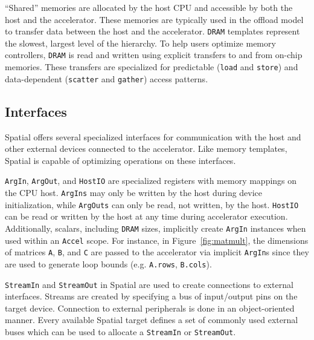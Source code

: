 ``Shared'' memories are allocated by the host CPU and accessible by both the host and the accelerator.
These memories are typically used in the offload model to transfer data between the host and the accelerator.
\texttt{\small{DRAM}} templates represent the slowest, largest level of the hierarchy. To help users optimize
memory controllers, \texttt{\small{DRAM}} is read and written using explicit transfers to and from on-chip memories.
These transfers are specialized for predictable (\texttt{\small{load}} and \texttt{\small{store}}) and data-dependent
(\texttt{\small{scatter}} and \texttt{\small{gather}}) access patterns.


\subsection{Interfaces}
Spatial offers several specialized interfaces for communication with the host and other external devices connected to the accelerator. Like memory templates, Spatial is capable of optimizing operations on these interfaces.

\texttt{\small{ArgIn}}, \texttt{\small{ArgOut}}, and \texttt{\small{HostIO}} are specialized registers with memory mappings on the CPU host.
\texttt{\small{ArgIns}} may only be written by the host during device initialization, while \texttt{\small{ArgOuts}} can only be read, not written, by the host.
\texttt{\small{HostIO}} can be read or written by the host at any time during accelerator execution.
Additionally, scalars, including \texttt{\small{DRAM}} sizes, implicitly create \texttt{\small{ArgIn}} instances when used within an \texttt{\small{Accel}} scope. For instance, in Figure~\ref{fig:matmult}, the dimensions of matrices \texttt{\small{A}}, \texttt{\small{B}}, and \texttt{\small{C}} are passed to the accelerator via implicit \texttt{\small{ArgIn}}s
since they are used to generate loop bounds (e.g. \texttt{\small{A.rows}}, \texttt{\small{B.cols}}).


\texttt{\small{StreamIn}} and \texttt{\small{StreamOut}} in Spatial are used to create connections to external interfaces.
Streams are created by specifying a bus of input/output pins on the target device.
Connection to external peripherals is done in an object-oriented manner. Every available Spatial target defines a set of commonly used external buses which can be used to allocate a \texttt{\small{StreamIn}} or \texttt{\small{StreamOut}}. %

